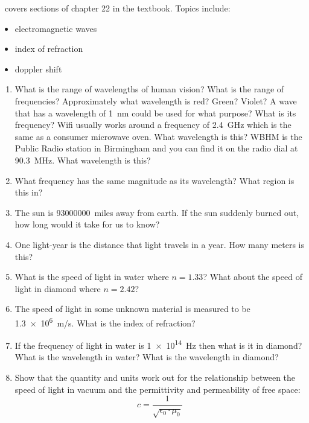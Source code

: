 \week \ covers sections of chapter 22 in the textbook. Topics include:

\begin{itemize}
	\item electromagnetic waves
	\item index of refraction
	\item doppler shift

\end{itemize}

\begin{enumerate}
\setlength\itemsep{2 in}

\item
What is the range of wavelengths of human vision? What is the range of frequencies? Approximately what wavelength is red? Green? Violet? A wave that has a wavelength of \SI{1}{nm} could be used for what purpose? What is its frequency? Wifi usually works around a frequency of \SI{2.4}{\giga\hertz} which is the same as a consumer microwave oven. What wavelength is this? WBHM is the Public Radio station in Birmingham and you can find it on the radio dial at \SI{90.3}{\mega\hertz}. What wavelength is this? \giantskip

\item
What frequency has the same magnitude as its wavelength? What region is this in?

\item
The sun is \SI{93000000}{miles} away from earth. If the sun suddenly burned out, how long would it take for us to know?

\item
One light-year is the distance that light travels in a year. How many meters is this?

\item
What is the speed of light in water where $n=1.33$? What about the speed of light in diamond where $n=2.42$? 

\item
The speed of light in some unknown material is measured to be \SI{1.3e6}{m/s}. What is the index of refraction?

\item
If the frequency of light in water is \SI{1e14}{\hertz} then what is it in diamond? What is the wavelength in water? What is the wavelength in diamond?

\item
Show that the quantity and units work out for the relationship between the speed of light in vacuum and the permittivity and permeability of free space: \[c = \frac{1}{\sqrt{\epsilon_0\cdot\mu_0}}\]


\end{enumerate}

